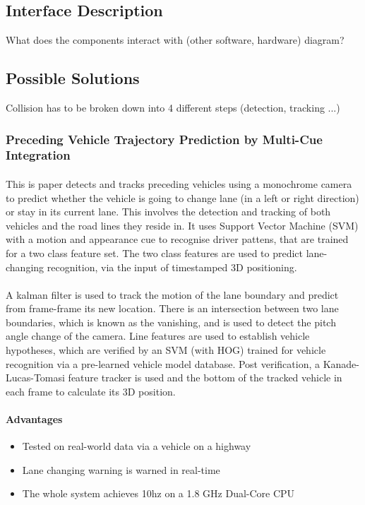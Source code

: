 \documentclass[]{report}
\begin{document}
\subsection{Interface Description} What does the components interact with (other software, hardware) diagram?

\subsection{Possible Solutions} Collision has to be broken down into 4 different steps (detection, tracking ...)

\subsubsection{Preceding Vehicle Trajectory Prediction by Multi-Cue Integration \citep{multi-cue}}

\paragraph {} This is paper \citep{multi-cue} detects and tracks preceding vehicles using a monochrome camera to predict whether the vehicle is going to change lane (in a left or right direction) or stay in its current lane. This involves the detection and tracking of both vehicles and the road lines they reside in. It uses Support Vector Machine (SVM) with a motion and appearance cue to recognise driver pattens, that are trained for a two class feature set. The two class features are used to predict lane-changing recognition, via the input of timestamped 3D positioning. 

\paragraph{}A kalman filter is used to track the motion of the lane boundary and predict from frame-frame its new location. There is an intersection between two lane boundaries, which is known as the vanishing, and is used to detect the pitch angle change of the camera. Line features are used to establish vehicle hypotheses, which are verified by an SVM (with HOG) trained for vehicle recognition via a pre-learned vehicle model database. Post verification, a Kanade-Lucas-Tomasi feature tracker is used and the bottom of the tracked vehicle in each frame to calculate its 3D position.
\paragraph{Advantages}
\begin{itemize}
\item Tested on real-world data via a vehicle on a highway
\item Lane changing warning is warned in real-time
\item The whole system achieves 10hz on a 1.8 GHz Dual-Core CPU
\end{itemize}
\end{document}

